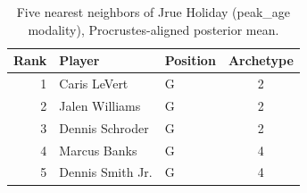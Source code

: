 \begin{table}[htbp]
  \centering\small
  \begin{tabular}{rllc}
    \toprule
    Rank & Player & Position & Archetype \\
    \midrule
    1 & Caris LeVert & G & 2 \\
    2 & Jalen Williams & G & 2 \\
    3 & Dennis Schroder & G & 2 \\
    4 & Marcus Banks & G & 4 \\
    5 & Dennis Smith Jr. & G & 4 \\
    \bottomrule
  \end{tabular}
  \caption{Five nearest neighbors of Jrue Holiday (peak_age modality), Procrustes-aligned posterior mean.}
  \label{tab:Jrue_Holiday_neighbors_peak_age}
\end{table}

